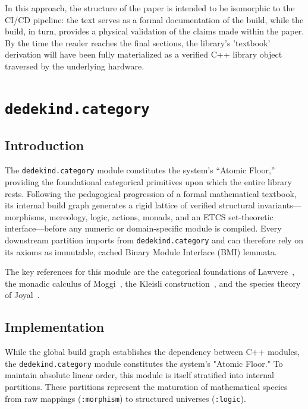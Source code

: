 \documentclass[11pt, a4paper]{report}
\begin{document}
In this approach, the structure of the paper is intended to be isomorphic to the CI/CD pipeline: the text serves as a formal documentation of the build, while the build, in turn, provides a physical validation of the claims made within the paper.
By the time the reader reaches the final sections, the library's 'textbook' derivation will have been fully materialized as a verified C++ library object traversed by the underlying hardware.


\chapter{\texttt{dedekind.category}}
\label{chap:category}

\section{Introduction}
\label{sec:category-intro}

The \texttt{dedekind.category} module constitutes the system's ``Atomic Floor,'' providing the foundational categorical primitives upon which the entire library rests. Following the pedagogical progression of a formal mathematical textbook, its internal build graph generates a rigid lattice of verified structural invariants---morphisms, mereology, logic, actions, monads, and an ETCS set-theoretic interface---before any numeric or domain-specific module is compiled. Every downstream partition imports from \texttt{dedekind.category} and can therefore rely on its axioms as immutable, cached Binary Module Interface (BMI) lemmata.

The key references for this module are the categorical foundations of Lawvere~\cite{lawvere1964etcs}, the monadic calculus of Moggi~\cite{moggi1991notions}, the Kleisli construction~\cite{kleisli1965every}, and the species theory of Joyal~\cite{joyal1981species}.

\section{Implementation}
\label{sec:category-impl}

While the global build graph establishes the dependency between C++ modules, the \texttt{dedekind.category} module constitutes the system's "Atomic Floor."
To maintain absolute linear order, this module is itself stratified into internal partitions.
These partitions represent the maturation of mathematical species from raw mappings (\texttt{:morphism}) to structured universes (\texttt{:logic}).
\end{document}

